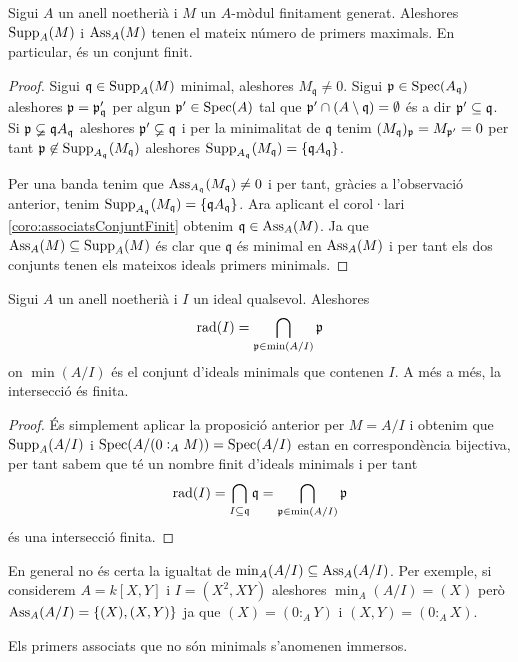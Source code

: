 \documentclass[../../../main.tex]{subfiles}
\begin{document}
\begin{prop}
\label{prop:supportAssociatsMateixNombreMinimals} Sigui $A$ un anell noetherià i $M$ un $A$-mòdul finitament generat. Aleshores $\operatorname{Supp}_A(M)$ i $\operatorname{Ass}_A(M)$ tenen el mateix número de primers maximals. En particular, és un conjunt finit.
\end{prop}
\begin{proof}
Sigui $\mathfrak{q}\in\operatorname{Supp}_A(M)$ minimal, aleshores $M_\mathfrak{q}\neq 0$. Sigui $\mathfrak{p}\in\mathrm{Spec}(A_\mathfrak{q})$ aleshores $\mathfrak{p} = \mathfrak{p}_\mathfrak{q}'$ per algun $\mathfrak{p}'\in\mathrm{Spec}(A)$ tal que $\mathfrak{p}'\cap (A\setminus \mathfrak{q}) = \emptyset$ és a dir $\mathfrak{p}'\subseteq \mathfrak{q}$. Si $\mathfrak{p}\varsubsetneq \mathfrak{q}A_\mathfrak{q}$ aleshores $\mathfrak{p}'\varsubsetneq \mathfrak{q}$ i per la minimalitat de $\mathfrak{q}$ tenim $(M_\mathfrak{q})_{\mathfrak{p}} = M_{\mathfrak{p}'} = 0$ per tant $\mathfrak{p}\not\in\operatorname{Supp}_{A_\mathfrak{q}}(M_\mathfrak{q})$ aleshores $\operatorname{Supp}_{A_\mathfrak{q}}(M_\mathfrak{q}) = \{\mathfrak{q}A_\mathfrak{q}\}$.

Per una banda tenim que $\operatorname{Ass}_{A_\mathfrak{q}}(M_\mathfrak{q})\neq 0$ i per tant, gràcies a l'observació anterior, tenim $\operatorname{Supp}_{A_\mathfrak{q}}(M_\mathfrak{q}) = \{\mathfrak{q}A_\mathfrak{q}\}$. Ara aplicant el corol·lari \ref{coro:associatsConjuntFinit} obtenim $\mathfrak{q}\in\operatorname{Ass}_A(M)$. Ja que $\operatorname{Ass}_A(M)\subseteq \operatorname{Supp}_A(M)$ és clar que $\mathfrak{q}$ és minimal en $\operatorname{Ass}_A(M)$ i per tant els dos conjunts tenen els mateixos ideals primers minimals.
\end{proof}


\begin{prop}
\label{prop:radicalInterseccioPrimersMinimals} Sigui $A$ un anell noetherià i $I$ un ideal qualsevol. Aleshores
\begin{equation}
    \notag
    \operatorname{\mathrm{rad}}(I) = \bigcap_{\mathfrak{p}\in\min(A/I)}\mathfrak{p} 
\end{equation}
on $\min(A/I)$ és el conjunt d'ideals minimals que contenen $I$. A més a més, la intersecció és finita.
\end{prop}
\begin{proof}
És simplement aplicar la proposició anterior per $M = A/I$ i obtenim que $\operatorname{Supp}_A(A/I)$ i $\mathrm{Spec}(A/(0:_AM)) = \mathrm{Spec}(A/I)$ estan en correspondència bijectiva, per tant sabem que té un nombre finit d'ideals minimals i per tant
\begin{equation}
    \notag
    \operatorname{\mathrm{rad}}(I) = \bigcap_{I\subseteq\mathfrak{q}} \mathfrak{q} = \bigcap_{\mathfrak{p}\in\min(A/I)}\mathfrak{p} 
\end{equation}
és una intersecció finita.
\end{proof}

En general no és certa la igualtat de $\min_A(A/I)\subseteq \operatorname{Ass}_A(A/I)$. Per exemple, si considerem $A = k[X,Y]$ i $I = (X^2,XY)$ aleshores $\min_A(A/I) = (X)$ però $\operatorname{Ass}_A(A/I) = \{(X),(X,Y)\}$ ja que $(X) = (0:_AY)$ i $(X,Y) = (0:_AX)$.


\begin{defi}[Immersos]
\label{def:immersos} Els primers associats que no són minimals s'anomenen immersos.
\end{defi}
\end{document}
